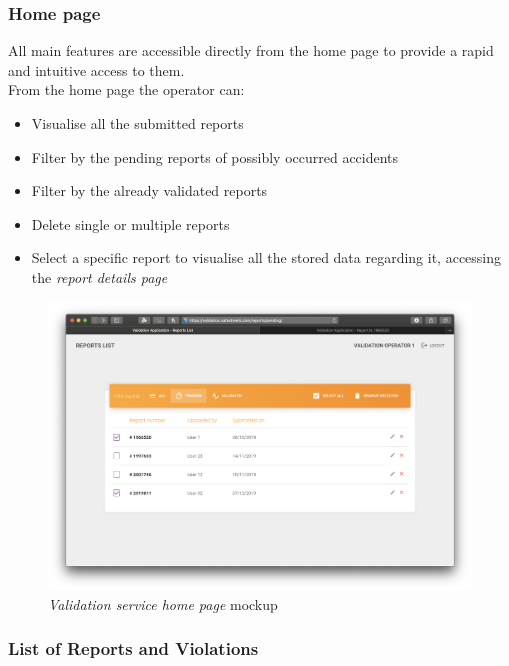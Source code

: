 \clearpage
\subsubsection{Home page}
All main features are accessible directly from the home page to provide a rapid and intuitive access to them. \\
From the home page the operator can:
\begin{itemize}
	\item Visualise all the submitted reports
	\item Filter by the pending reports of possibly occurred accidents
	\item Filter by the already validated reports
	\item Delete single or multiple reports
	\item Select a specific report to visualise all the stored data regarding it, accessing the \emph{report details page}\newline\newline
\end{itemize}
 
 \begin{figure}[ht!]
 	\hspace*{-1cm}
			\centering
			\includegraphics[scale=0.3]{mockups/validationApp1.png}
			\caption{
				\label{fig:cc1} 
				\emph{Validation service home page} mockup
			}
		\end{figure}

		\clearpage
\subsubsection{List of Reports and Violations}

